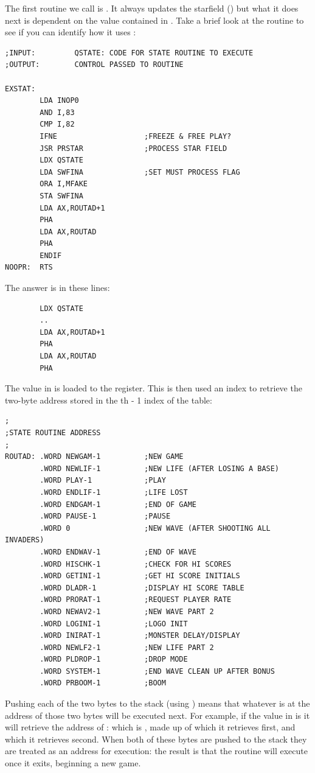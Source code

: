 The first routine we call is . It always updates the starfield () but what it
does next is dependent on the value contained in . Take a brief look at the routine to see if
you can identify how it uses :
\begin{lstlisting}
;INPUT:         QSTATE: CODE FOR STATE ROUTINE TO EXECUTE
;OUTPUT:        CONTROL PASSED TO ROUTINE

EXSTAT:
        LDA INOP0
        AND I,83
        CMP I,82
        IFNE                    ;FREEZE & FREE PLAY?
        JSR PRSTAR              ;PROCESS STAR FIELD
        LDX QSTATE
        LDA SWFINA              ;SET MUST PROCESS FLAG
        ORA I,MFAKE
        STA SWFINA
        LDA AX,ROUTAD+1
        PHA
        LDA AX,ROUTAD
        PHA
        ENDIF
NOOPR:  RTS
\end{lstlisting}

The answer is in these lines:
\begin{lstlisting}
        LDX QSTATE
        ..
        LDA AX,ROUTAD+1
        PHA
        LDA AX,ROUTAD
        PHA
\end{lstlisting}

The value in  is loaded to the  register. This is then used an index to retrieve the two-byte address
stored in the th - 1 index of the  table: 
\begin{lstlisting}
;
;STATE ROUTINE ADDRESS
;
ROUTAD: .WORD NEWGAM-1          ;NEW GAME
        .WORD NEWLIF-1          ;NEW LIFE (AFTER LOSING A BASE)
        .WORD PLAY-1            ;PLAY
        .WORD ENDLIF-1          ;LIFE LOST
        .WORD ENDGAM-1          ;END OF GAME
        .WORD PAUSE-1           ;PAUSE
        .WORD 0                 ;NEW WAVE (AFTER SHOOTING ALL INVADERS)
        .WORD ENDWAV-1          ;END OF WAVE
        .WORD HISCHK-1          ;CHECK FOR HI SCORES
        .WORD GETINI-1          ;GET HI SCORE INITIALS
        .WORD DLADR-1           ;DISPLAY HI SCORE TABLE
        .WORD PRORAT-1          ;REQUEST PLAYER RATE
        .WORD NEWAV2-1          ;NEW WAVE PART 2
        .WORD LOGINI-1          ;LOGO INIT
        .WORD INIRAT-1          ;MONSTER DELAY/DISPLAY
        .WORD NEWLF2-1          ;NEW LIFE PART 2
        .WORD PLDROP-1          ;DROP MODE
        .WORD SYSTEM-1          ;END WAVE CLEAN UP AFTER BONUS
        .WORD PRBOOM-1          ;BOOM
\end{lstlisting}

Pushing each of the two bytes to the stack (using ) means that whatever is at the address of those two bytes will
be executed next. For example, if the value in  is  it will retrieve the address of : which is
, made up of  which it retrieves first, and  which it retrieves second. When both of these bytes
are pushed to the stack they are treated as an address for execution: the result is that the  routine will execute
 once it exits, beginning a new game. 

